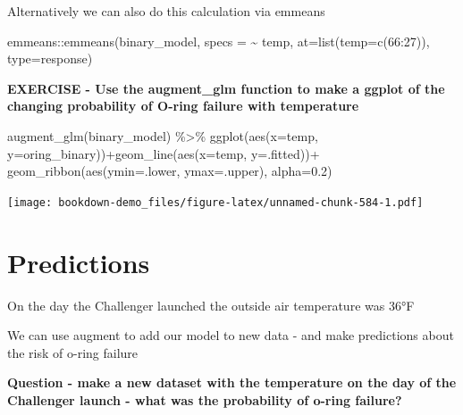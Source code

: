 \documentclass[
]{book}
\newenvironment{Shaded}{\begin{snugshade}}{\end{snugshade}}
\newcommand{\AttributeTok}[1]{\textcolor[rgb]{0.77,0.63,0.00}{#1}}
\newcommand{\DecValTok}[1]{\textcolor[rgb]{0.00,0.00,0.81}{#1}}
\newcommand{\FloatTok}[1]{\textcolor[rgb]{0.00,0.00,0.81}{#1}}
\newcommand{\FunctionTok}[1]{\textcolor[rgb]{0.00,0.00,0.00}{#1}}
\newcommand{\NormalTok}[1]{#1}
\newcommand{\SpecialCharTok}[1]{\textcolor[rgb]{0.00,0.00,0.00}{#1}}
\newcommand{\StringTok}[1]{\textcolor[rgb]{0.31,0.60,0.02}{#1}}
\begin{document}
Alternatively we can also do this calculation via emmeans

\begin{Shaded}
\begin{Highlighting}[]
\NormalTok{emmeans}\SpecialCharTok{::}\FunctionTok{emmeans}\NormalTok{(binary\_model, }\AttributeTok{specs =} \SpecialCharTok{\textasciitilde{}}\NormalTok{ temp, }\AttributeTok{at=}\FunctionTok{list}\NormalTok{(}\AttributeTok{temp=}\FunctionTok{c}\NormalTok{(}\DecValTok{66}\SpecialCharTok{:}\DecValTok{27}\NormalTok{)), }\AttributeTok{type=}\StringTok{\textquotesingle{}response\textquotesingle{}}\NormalTok{) }
\end{Highlighting}
\end{Shaded}

\textbf{EXERCISE - Use the augment\_glm function to make a ggplot of the changing probability of O-ring failure with temperature}

\begin{Shaded}
\begin{Highlighting}[]
\FunctionTok{augment\_glm}\NormalTok{(binary\_model) }\SpecialCharTok{\%\textgreater{}\%} 
  \FunctionTok{ggplot}\NormalTok{(}\FunctionTok{aes}\NormalTok{(}\AttributeTok{x=}\NormalTok{temp, }\AttributeTok{y=}\NormalTok{oring\_binary))}\SpecialCharTok{+}\FunctionTok{geom\_line}\NormalTok{(}\FunctionTok{aes}\NormalTok{(}\AttributeTok{x=}\NormalTok{temp, }\AttributeTok{y=}\NormalTok{.fitted))}\SpecialCharTok{+}
  \FunctionTok{geom\_ribbon}\NormalTok{(}\FunctionTok{aes}\NormalTok{(}\AttributeTok{ymin=}\NormalTok{.lower, }\AttributeTok{ymax=}\NormalTok{.upper), }\AttributeTok{alpha=}\FloatTok{0.2}\NormalTok{)}
\end{Highlighting}
\end{Shaded}

\texttt{[image: bookdown-demo\_files/figure-latex/unnamed-chunk-584-1.pdf]}

\hypertarget{predictions}{%
\section{Predictions}\label{predictions}}

On the day the Challenger launched the outside air temperature was 36°F

We can use augment to add our model to new data - and make predictions about the risk of o-ring failure

\textbf{Question - make a new dataset with the temperature on the day of the Challenger launch - what was the probability of o-ring failure?}
\end{document}
